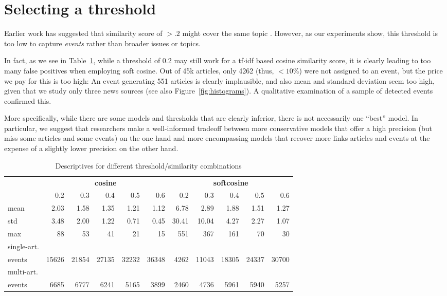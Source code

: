 \documentclass[a4paper,man,natbib,floatsintext,mask]{apa6}
\begin{document}




\section{Selecting a threshold}

Earlier work has suggested that similarity score of $>.2$ might cover the same topic \citep{Welbers2016}. However, as our experiments show, this threshold is too low to capture \emph{events} rather than broader issues or topics.

In fact, as we see in Table~\ref{tab:thresholds}, while a threshold of 0.2 may still work for a tf$\cdot$idf based cosine similarity score, it is clearly leading to too many false positives when employing soft cosine.
Out of 45k articles, only 4262 (thus, $<10\%$) were not assigned to an event, but the price we pay for this is too high: An event generating 551 articles is clearly implausible, and also mean and standard deviation seem too high, given that we study only three news sources (see also Figure~\ref{fig:histograms}).
A qualitative examination of a sample of detected events confirmed this.

More specifically, while there are some models and thresholds that are clearly inferior, there is not necessarily one ``best'' model.
In particular, we suggest that researchers make a well-informed tradeoff between more conservative models that offer a high precision (but miss some articles and some events) on the one hand and more encompassing models that recover more links articles and events at the expense of a slightly lower precision on the other hand.

\begin{table}[h]
\caption{Descriptives for different threshold/similarity combinations\label{tab:thresholds}}

\centering
\begin{tabular}{lrrrrrrrrrr}
\toprule
{} & \multicolumn{5}{c}{\textbf{cosine}} & \multicolumn{5}{c}{\textbf{softcosine}} \\
{} &    0.2  & 0.3 & 0.4 & 0.5 & 0.6 & 0.2 & 0.3  & 0.4 & 0.5 & 0.6  \\
\midrule
mean              &  2.03 & 1.58 & 1.35 & 1.21 & 1.12 & 6.78 & 2.89 & 1.88 & 1.51  & 1.27 \\
std              &  3.48 & 2.00 & 1.22 & 0.71 & 0.45  & 30.41 & 10.04 & 4.27 & 2.27 & 1.07 \\
max              &   88 & 53 & 41 & 21   & 15 & 551 & 367 & 161 & 70 & 30  \\
single-art.\\ events & 15626  & 21854  & 27135 & 32232 & 36348 & 4262 & 11043 & 18305 & 24337 & 30700 \\
multi-art.\\ events & 6685 & 6777 & 6241 & 5165 & 3899 & 2460 & 4736 & 5961 & 5940 & 5257 \\
\bottomrule
\end{tabular}
\end{table}
\end{document}
